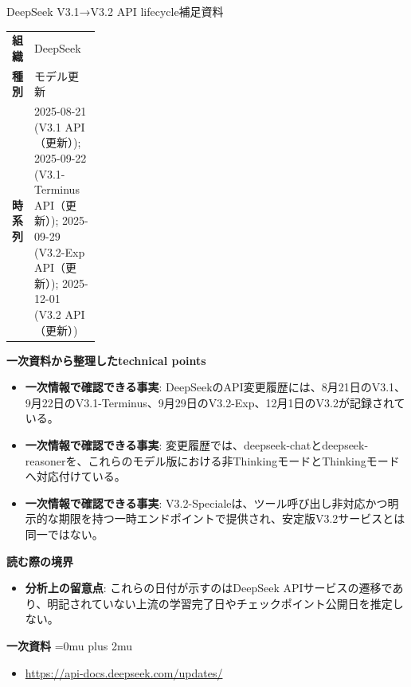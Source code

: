 \begin{technicalnote}{DeepSeek V3.1→V3.2 API lifecycle}{補足資料}
\begingroup
\begin{tabularx}{\linewidth}{@{}>{\bfseries}p{0.22\linewidth}X@{}}
組織 & DeepSeek \\
種別 & モデル更新 \\
時系列 & 2025-08-21 (V3.1 API（更新）); 2025-09-22 (V3.1-Terminus API（更新）); 2025-09-29 (V3.2-Exp API（更新）); 2025-12-01 (V3.2 API（更新）) \\
\end{tabularx}
\smallskip
{\bfseries 一次資料から整理したtechnical points}
\begin{itemize}[leftmargin=1.5em,itemsep=0.35em]
\item \textbf{一次情報で確認できる事実}: DeepSeekのAPI変更履歴には、8月21日のV3.1、9月22日のV3.1-Terminus、9月29日のV3.2-Exp、12月1日のV3.2が記録されている。
\item \textbf{一次情報で確認できる事実}: 変更履歴では、deepseek-chatとdeepseek-reasonerを、これらのモデル版における非ThinkingモードとThinkingモードへ対応付けている。
\item \textbf{一次情報で確認できる事実}: V3.2-Specialeは、ツール呼び出し非対応かつ明示的な期限を持つ一時エンドポイントで提供され、安定版V3.2サービスとは同一ではない。
\end{itemize}
\begin{minipage}{\linewidth}
{\bfseries 読む際の境界}
\begin{itemize}[leftmargin=1.5em,itemsep=0.35em]
\item \textbf{分析上の留意点}: これらの日付が示すのはDeepSeek APIサービスの遷移であり、明記されていない上流の学習完了日やチェックポイント公開日を推定しない。
\end{itemize}
\begin{samepage}
{\bfseries 一次資料}
\begingroup\sloppy
\Urlmuskip=0mu plus 2mu\relax
\begin{itemize}[leftmargin=1.5em,itemsep=0.25em]
\item {\scriptsize\url{https://api-docs.deepseek.com/updates/}}
\end{itemize}
\endgroup
\end{samepage}
\end{minipage}
\endgroup
\end{technicalnote}
\medskip

